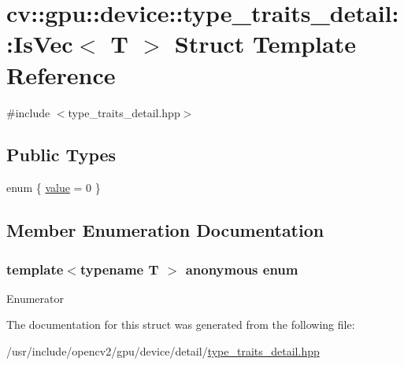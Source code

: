 \hypertarget{structcv_1_1gpu_1_1device_1_1type__traits__detail_1_1IsVec}{\section{cv\-:\-:gpu\-:\-:device\-:\-:type\-\_\-traits\-\_\-detail\-:\-:Is\-Vec$<$ T $>$ Struct Template Reference}
\label{structcv_1_1gpu_1_1device_1_1type__traits__detail_1_1IsVec}
}


{\ttfamily \#include $<$type\-\_\-traits\-\_\-detail.\-hpp$>$}

\subsection*{Public Types}
\begin{DoxyCompactItemize}
\item 
enum \{ \hyperlink{structcv_1_1gpu_1_1device_1_1type__traits__detail_1_1IsVec_a32a5bff507f871b4365a541f78cc0c45acd1618dc7789a70a4cba366ddea4ea41}{value} = 0
 \}
\end{DoxyCompactItemize}


\subsection{Member Enumeration Documentation}
\hypertarget{structcv_1_1gpu_1_1device_1_1type__traits__detail_1_1IsVec_a32a5bff507f871b4365a541f78cc0c45}{\subsubsection[{anonymous enum}]{\setlength{\rightskip}{0pt plus 5cm}template$<$typename T $>$ anonymous enum}}\label{structcv_1_1gpu_1_1device_1_1type__traits__detail_1_1IsVec_a32a5bff507f871b4365a541f78cc0c45}
\begin{Desc}
\item[Enumerator]\par
\begin{description}
\item[{\em 
\hypertarget{structcv_1_1gpu_1_1device_1_1type__traits__detail_1_1IsVec_a32a5bff507f871b4365a541f78cc0c45acd1618dc7789a70a4cba366ddea4ea41}{value}\label{structcv_1_1gpu_1_1device_1_1type__traits__detail_1_1IsVec_a32a5bff507f871b4365a541f78cc0c45acd1618dc7789a70a4cba366ddea4ea41}
}]\end{description}
\end{Desc}


The documentation for this struct was generated from the following file\-:\begin{DoxyCompactItemize}
\item 
/usr/include/opencv2/gpu/device/detail/\hyperlink{type__traits__detail_8hpp}{type\-\_\-traits\-\_\-detail.\-hpp}\end{DoxyCompactItemize}
